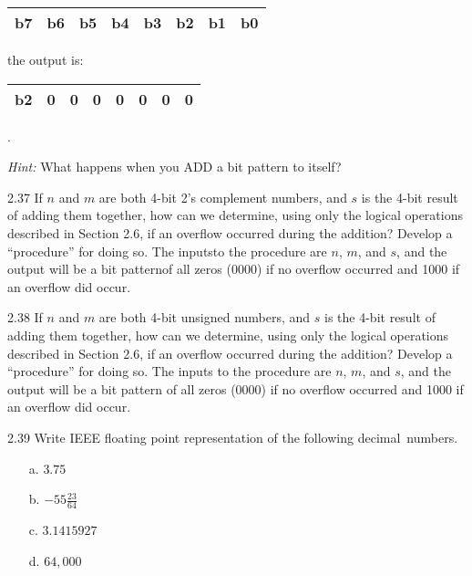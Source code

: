 \documentclass{patt}
\begin{document}
\begin{exercises}
\begin{enumerate}[a.]
\begin{tabular}{|c|c|c|c|c|c|c|c|} \hline
  \rule{0pt}{10pt}b7\rule{0pt}{10pt} & b6 & b5 & b4 & b3 & b2 & b1 & b0 \\ \hline
\end{tabular}

\smallskip

\noindent
the output is:

\smallskip

\begin{tabular}{|c|c|c|c|c|c|c|c|} \hline
  \rule{0pt}{10pt}b2\rule{0pt}{10pt} & 0 & 0 & 0 & 0 & 0 & 0 & 0 \\ \hline
\end{tabular}.

\smallskip

\noindent
{\em Hint:} What happens when you ADD a bit pattern to itself?
\end{enumerate}

\removelastskip
\pagebreak


\item[2.37] %
If $n$ and $m$ are both 4-bit 2's complement numbers, and $s$
is the 4-bit result of adding them together, how can we
determine, using only the logical operations described in Section
2.6, if an overflow occurred during the addition? Develop
a ``procedure'' for doing so. The inputs\break to the procedure
are $n$, $m$, and $s$, and the output will be a bit pattern\break of
all zeros (0000) if no overflow occurred and 1000 if an overflow\break
did occur.

\smallskip

\item[2.38] %
If $n$ and $m$ are both 4-bit unsigned numbers, and $s$ is the
4-bit result of adding them together, how can we determine,
using only the logical operations described in Section 2.6, if
an overflow occurred during the\break
addition? Develop a ``procedure''
for doing so. The inputs to the procedure are $n$, $m$,
and $s$, and the output will be a bit pattern of\break
all zeros (0000) if no overflow occurred and 1000 if an overflow\break
did occur.

\smallskip

\item[2.39] %
Write IEEE floating point representation of the following
decimal~numbers.

\begin{enumerate}[a.]
\item[a.] $3.75$
\item[b.] $-55 \frac{23}{64}$
\item[c.] $3.1415927$
\item[d.] $64{,}000$
\end{enumerate}


\end{exercises}
\end{document}
